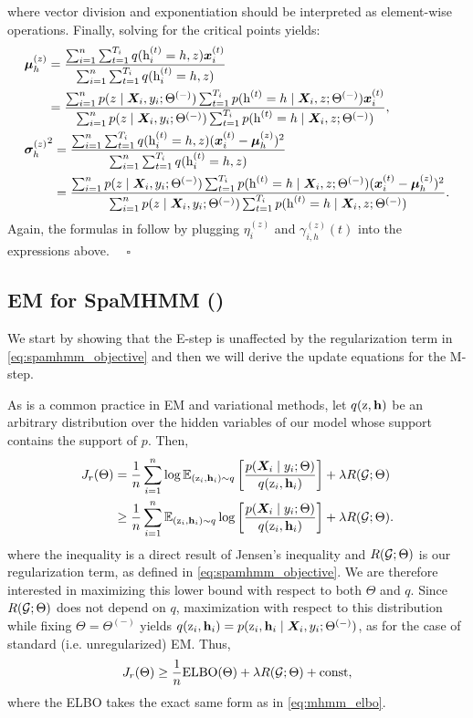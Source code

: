 where vector division and exponentiation should be interpreted as element-wise operations. Finally, solving for the critical points yields:
\begin{align}
&\vmu^{(z)}_h = \frac{\sum_{i=1}^n  \sum_{t=1}^{T_i} q(\rh^{(t)}_i=h, z) \vx^{(t)}_i}{\sum_{i=1}^n  \sum_{t=1}^{T_i} q(\rh^{(t)}_i=h, z)} \nonumber\\
&\hphantom{\vmu^{(z)}_h} = \frac{\sum_{i=1}^n p(z \mid \mX_i, y_i; \Theta^{(-)}) \sum_{t=1}^{T_i} p(\rh^{(t)}=h \mid \mX_i, z; \Theta^{(-)}) \vx^{(t)}_i}{\sum_{i=1}^n p(z \mid \mX_i, y_i; \Theta^{(-)}) \sum_{t=1}^{T_i} p(\rh^{(t)}=h \mid \mX_i, z; \Theta^{(-)})}, \\
&{\vsigma^{(z)}_h}^2 = \frac{\sum_{i=1}^n  \sum_{t=1}^{T_i} q(\rh^{(t)}_i=h, z) (\vx^{(t)}_i - \vmu^{(z)}_h)^2}{\sum_{i=1}^n  \sum_{t=1}^{T_i} q(\rh^{(t)}_i=h, z)} \nonumber\\
&\hphantom{{\vsigma^{(z)}_h}^2} = \frac{\sum_{i=1}^n p(z \mid \mX_i, y_i; \Theta^{(-)}) \sum_{t=1}^{T_i} p(\rh^{(t)}=h \mid \mX_i, z; \Theta^{(-)}) (\vx^{(t)}_i - \vmu^{(z)}_h)^2}{\sum_{i=1}^n p(z \mid \mX_i, y_i; \Theta^{(-)}) \sum_{t=1}^{T_i} p(\rh^{(t)}=h \mid \mX_i, z; \Theta^{(-)})}.
\end{align}
Again, the formulas in  follow by plugging $\eta^{(z)}_i$ and $\gamma^{(z)}_{i,h}(t)$ into the expressions above. $\quad \square$

\subsection{EM for SpaMHMM ()}
\label{sec:proof_em_reg}
We start by showing that the E-step is unaffected by the regularization term in \eqref{eq:spamhmm_objective} and then we will derive the update equations for the M-step.

As is a common practice in EM and variational methods, let $q({\textnormal{z}}, {\mathbf{h}})$ be an arbitrary distribution over the hidden variables of our model whose support contains the support of $p$. Then,
\begin{align}
	J_r(\Theta) &= \frac{1}{n}\sum_{i=1}^n \log \mathbb{E}_{({\textnormal{z}}_i, {\mathbf{h}}_i) \sim q} \left[ \frac{p({\bm{X}}_i \mid y_i; \Theta)}{q({\textnormal{z}}_i, {\mathbf{h}}_i)} \right] + \lambda R({\mathcal{G}}; \Theta) \nonumber\\
	&\geq  \frac{1}{n}\sum_{i=1}^n \mathbb{E}_{({\textnormal{z}}_i, {\mathbf{h}}_i) \sim q} \log \left[ \frac{p({\bm{X}}_i \mid y_i; \Theta)}{q({\textnormal{z}}_i, {\mathbf{h}}_i)} \right] + \lambda R({\mathcal{G}}; \Theta).
\end{align}
where the inequality is a direct result of Jensen's inequality and $R({\mathcal{G}}; \Theta)$ is our regularization term, as defined in \eqref{eq:spamhmm_objective}. We are therefore interested in maximizing this lower bound with respect to both $\Theta$ and $q$. Since $R({\mathcal{G}}; \Theta)$ does not depend on $q$, maximization with respect to this distribution while fixing $\Theta = \Theta^{(-)}$ yields $q({\textnormal{z}}_i, {\mathbf{h}}_i) = p({\textnormal{z}}_i, {\mathbf{h}}_i \mid {\bm{X}}_i, y_i; \Theta^{(-)})$, as for the case of standard (i.e. unregularized) EM. Thus,
\begin{equation}
	J_r(\Theta) \geq \frac{1}{n} \mathrm{ELBO}(\Theta) + \lambda R({\mathcal{G}}; \Theta) + \text{const},
\end{equation}
where the ELBO takes the exact same form as in \eqref{eq:mhmm_elbo}.

